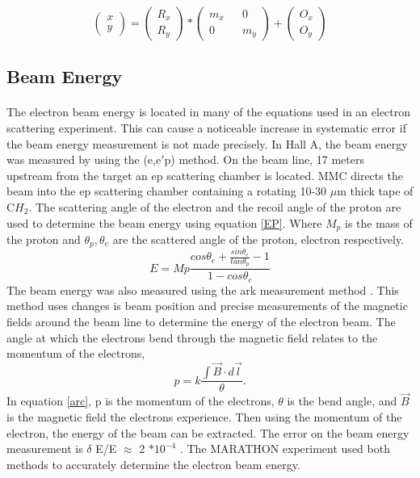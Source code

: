 	 
	 \begin{equation}
	 	\begin{pmatrix}
		 	x\\
	 		y
	 	\end{pmatrix}
	 	=
	 	\begin{pmatrix}
	 		R_x\\
		 	R_y
	 	\end{pmatrix}
	 	*
	 	\begin{pmatrix}
			m_x && 0 \\
			0  && m_y
	 	\end{pmatrix}
	 	+
	 	\begin{pmatrix}
		 	O_x\\
	 		O_y
	 	\end{pmatrix}
	 	\label{eq:raster}
	 \end{equation}

 
	 \subsection{Beam Energy}
	 \paragraph{}The electron beam energy is located in many of the equations used in an electron scattering experiment. This can cause a noticeable increase in systematic error if the beam energy measurement is not made precisely. In Hall A, the beam energy was measured by using the (e,e$\prime$p) method. On the beam line, 17 meters upstream from the target an ep scattering chamber is located. MMC directs the beam into the ep scattering chamber containing a rotating 10-30 $\mu$m thick tape of C$H_2$. The scattering angle of the electron and the recoil angle of the proton are used to determine the beam energy using equation \ref{EP}. Where $M_p$ is the mass of the proton and $\theta_p, \theta_e$ are the scattered angle of the proton, electron respectively. 
	\begin{equation}
	\label{EP}
	E = Mp \frac{cos\theta_e + \frac{sin\theta_e}{tan\theta_p}-1}{1 - cos\theta_e} 
	\end{equation}
	The beam energy was also measured using the ark measurement method \cite{Flay}. This method uses changes is beam position and precise measurements of the magnetic fields around the beam line to determine the energy of the electron beam. The angle at which the electrons bend through the magnetic field relates to the momentum of the electrons,
	\begin{equation}
	\label{arc}
	p = k \frac{\int \vec{B} \cdot d\vec{l}}{\theta}.
	\end{equation}	
	In equation \ref{arc}, p is the momentum of the electrons, $\theta$ is the bend angle, and $\vec{B}$ is the magnetic field the electrons experience. Then using the momentum of the electron, the energy of the beam can be extracted. The error on the beam energy measurement is $\delta$ E/E $\approx$ 2 $* 10^{-4} $ \cite{EPMet, Flay}.  The MARATHON experiment used both methods to accurately determine the electron beam energy.
	

